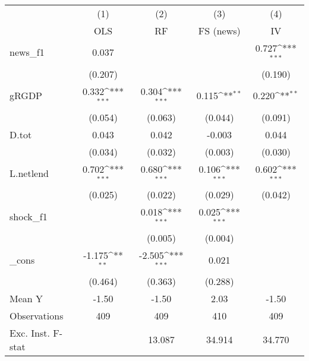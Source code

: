 {
\def\sym#1{\ifmmode^{#1}\else\(^{#1}\)\fi}
\begin{tabular}{l*{4}{c}}
\toprule
            &\multicolumn{1}{c}{(1)}&\multicolumn{1}{c}{(2)}&\multicolumn{1}{c}{(3)}&\multicolumn{1}{c}{(4)}\\
            &\multicolumn{1}{c}{OLS}&\multicolumn{1}{c}{RF}&\multicolumn{1}{c}{FS (news)}&\multicolumn{1}{c}{IV}\\
\midrule
news\_f1     &       0.037         &                     &                     &       0.727\sym{***}\\
            &     (0.207)         &                     &                     &     (0.190)         \\
\addlinespace
gRGDP       &       0.332\sym{***}&       0.304\sym{***}&       0.115\sym{**} &       0.220\sym{**} \\
            &     (0.054)         &     (0.063)         &     (0.044)         &     (0.091)         \\
\addlinespace
D.tot       &       0.043         &       0.042         &      -0.003         &       0.044         \\
            &     (0.034)         &     (0.032)         &     (0.003)         &     (0.030)         \\
\addlinespace
L.netlend   &       0.702\sym{***}&       0.680\sym{***}&       0.106\sym{***}&       0.602\sym{***}\\
            &     (0.025)         &     (0.022)         &     (0.029)         &     (0.042)         \\
\addlinespace
shock\_f1    &                     &       0.018\sym{***}&       0.025\sym{***}&                     \\
            &                     &     (0.005)         &     (0.004)         &                     \\
\addlinespace
\_cons      &      -1.175\sym{**} &      -2.505\sym{***}&       0.021         &                     \\
            &     (0.464)         &     (0.363)         &     (0.288)         &                     \\
\midrule
Mean Y      &       -1.50         &       -1.50         &        2.03         &       -1.50         \\
Observations&         409         &         409         &         410         &         409         \\
Exc. Inst. F-stat&                     &      13.087         &      34.914         &      34.770         \\
\bottomrule
\end{tabular}
}
